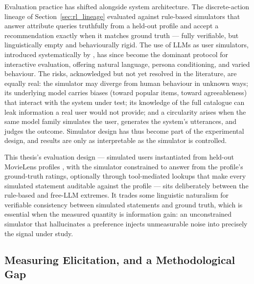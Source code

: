 Evaluation practice has shifted alongside system architecture. The discrete-action lineage of Section~\ref{sec:rl_lineage} evaluated against rule-based simulators that answer attribute queries truthfully from a held-out profile and accept a recommendation exactly when it matches ground truth \citep{lei2020estimation, deng2021unified} — fully verifiable, but linguistically empty and behaviourally rigid. The use of LLMs as user simulators, introduced systematically by \citet{wang2023rethinking}, has since become the dominant protocol for interactive evaluation, offering natural language, persona conditioning, and varied behaviour. The risks, acknowledged but not yet resolved in the literature, are equally real: the simulator may diverge from human behaviour in unknown ways; its underlying model carries biases (toward popular items, toward agreeableness) that interact with the system under test; its knowledge of the full catalogue can leak information a real user would not provide; and a circularity arises when the same model family simulates the user, generates the system's utterances, and judges the outcome. Simulator design has thus become part of the experimental design, and results are only as interpretable as the simulator is controlled.

This thesis's evaluation design — simulated users instantiated from held-out MovieLens profiles \citep{harper2015movielens}, with the simulator constrained to answer from the profile's ground-truth ratings, optionally through tool-mediated lookups that make every simulated statement auditable against the profile — sits deliberately between the rule-based and free-LLM extremes. It trades some linguistic naturalism for verifiable consistency between simulated statements and ground truth, which is essential when the measured quantity is information gain: an unconstrained simulator that hallucinates a preference injects unmeasurable noise into precisely the signal under study.

\subsection{Measuring Elicitation, and a Methodological Gap}

